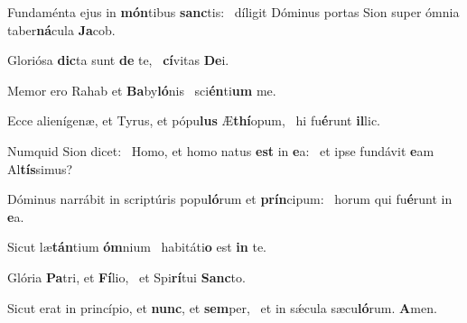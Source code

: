 \item Fundaménta ejus in \textbf{món}tibus \textbf{sanc}tis:~\psstar{} díligit Dóminus portas Sion super ómnia taber\textbf{ná}cula \textbf{Ja}cob.
\item Gloriósa \textbf{dic}ta sunt \textbf{de} te,~\psstar{} \textbf{cí}vitas \textbf{De}i.
\item Memor ero Rahab et \textbf{Ba}by\textbf{ló}nis~\psstar{} sci\textbf{én}ti\textbf{um} me.
\item Ecce alienígenæ, et Tyrus, et pópu\textbf{lus} Æ\textbf{thí}opum,~\psstar{} hi fu\textbf{é}runt \textbf{il}lic.
\item Numquid Sion dicet:~\pscross{} Homo, et homo natus \textbf{est} in \textbf{e}a:~\psstar{} et ipse fundávit \textbf{e}am Al\textbf{tís}simus?
\item Dóminus narrábit in scriptúris popu\textbf{ló}rum et \textbf{prín}cipum:~\psstar{} horum qui fu\textbf{é}runt in \textbf{e}a.
\item Sicut læ\textbf{tán}tium \textbf{óm}nium~\psstar{} habitáti\textbf{o} est \textbf{in} te.
\item Glória \textbf{Pa}tri, et \textbf{Fí}lio,~\psstar{} et Spi\textbf{rí}tui \textbf{Sanc}to.
\item Sicut erat in princípio, et \textbf{nunc}, et \textbf{sem}per,~\psstar{} et in sǽcula sæcu\textbf{ló}rum. \textbf{A}men.
